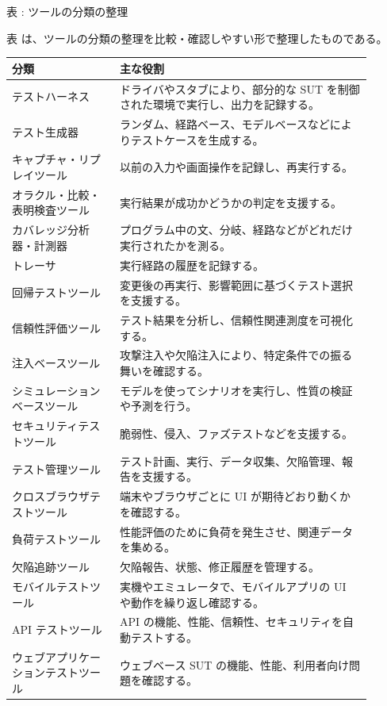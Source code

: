 \par\smallskip\noindent{}\label{tab:ch05-03}表 \thetable: ツールの分類の整理\par\smallskip
表 \thetable は、ツールの分類の整理を比較・確認しやすい形で整理したものである。\par\smallskip
\begin{longtable}{P{0.27\linewidth}P{0.63\linewidth}}
\toprule
分類 & 主な役割 \\
\midrule
テストハーネス & ドライバやスタブにより、部分的な SUT を制御された環境で実行し、出力を記録する。\\
テスト生成器 & ランダム、経路ベース、モデルベースなどによりテストケースを生成する。\\
キャプチャ・リプレイツール & 以前の入力や画面操作を記録し、再実行する。\\
オラクル・比較・表明検査ツール & 実行結果が成功かどうかの判定を支援する。\\
カバレッジ分析器・計測器 & プログラム中の文、分岐、経路などがどれだけ実行されたかを測る。\\
トレーサ & 実行経路の履歴を記録する。\\
回帰テストツール & 変更後の再実行、影響範囲に基づくテスト選択を支援する。\\
信頼性評価ツール & テスト結果を分析し、信頼性関連測度を可視化する。\\
注入ベースツール & 攻撃注入や欠陥注入により、特定条件での振る舞いを確認する。\\
シミュレーションベースツール & モデルを使ってシナリオを実行し、性質の検証や予測を行う。\\
セキュリティテストツール & 脆弱性、侵入、ファズテストなどを支援する。\\
テスト管理ツール & テスト計画、実行、データ収集、欠陥管理、報告を支援する。\\
クロスブラウザテストツール & 端末やブラウザごとに UI が期待どおり動くかを確認する。\\
負荷テストツール & 性能評価のために負荷を発生させ、関連データを集める。\\
欠陥追跡ツール & 欠陥報告、状態、修正履歴を管理する。\\
モバイルテストツール & 実機やエミュレータで、モバイルアプリの UI や動作を繰り返し確認する。\\
API テストツール & API の機能、性能、信頼性、セキュリティを自動テストする。\\
ウェブアプリケーションテストツール & ウェブベース SUT の機能、性能、利用者向け問題を確認する。\\
\bottomrule
\end{longtable}

